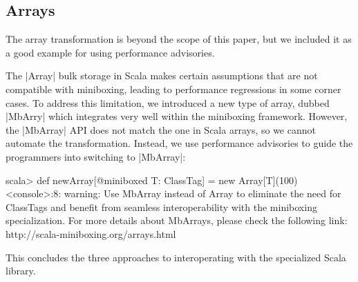 \subsection{Arrays}
\label{sec:mbarrays}

The array transformation \cite{romain-mbarrays} is beyond the scope of this paper, but we included it as a good example for using performance advisories.

The |Array| bulk storage in Scala makes certain assumptions that are not compatible with miniboxing, leading to performance regressions in some corner cases. To address this limitation, we introduced a new type of array, dubbed |MbArry| which integrates very well within the miniboxing framework. However, the |MbArray| API does not match the one in Scala arrays, so we cannot automate the transformation. Instead, we use performance advisories to guide the programmers into switching to |MbArray|:

\begin{lstlisting-nobreak-nolang}
scala> def newArray[@miniboxed T: ClassTag] = new Array[T](100)
<console>:8: warning: Use MbArray instead of Array to eliminate the need for ClassTags and benefit from seamless interoperability with the miniboxing specialization. For more details about MbArrays, please check the following link: http://scala-miniboxing.org/arrays.html
\end{lstlisting-nobreak-nolang}

This concludes the three approaches to interoperating with the specialized Scala library.

